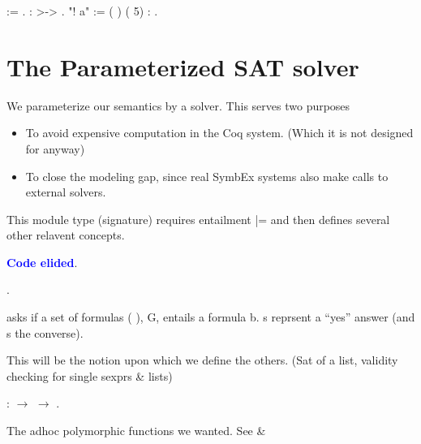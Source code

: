 \documentclass[12pt]{report}
\begin{document}
\begin{coqdoccode}
\coqdocnoindent
{}  :=  .\coqdoceol
\coqdocnoindent
{}  :  >-> .\coqdoceol
\coqdocnoindent
{} "! a" := (  ) (  5) : .\coqdoceol
\coqdocemptyline
\end{coqdoccode}
\section{The Parameterized SAT solver}

 We parameterize our semantics by a solver. This serves two purposes

\begin{itemize}
\item  To avoid expensive computation in the Coq system. (Which it is not designed for anyway) 

\item  To close the modeling gap, since real SymbEx systems also make calls to external solvers.

\end{itemize}


    This module type (signature) requires entailment |= and then defines several other relavent
    concepts.


    \textcolor{blue}{\textbf{Code elided}}.



\begin{coqdoccode}
\coqdocnoindent
{}  .\coqdoceol
\coqdocemptyline
\end{coqdoccode}
   asks if a set of formulas
      ( ), G, entails a formula b. s
      reprsent a ``yes'' answer (and s the converse).


      This will be the notion upon which we define the others.
      (Sat of a list, validity checking for single sexprs \& lists)


  
\begin{coqdoccode}
\coqdocindent{1.00em}
  :   \ensuremath{\rightarrow}  \ensuremath{\rightarrow}   .\coqdoceol
\coqdocemptyline
\end{coqdoccode}
The adhoc polymorphic functions we wanted. See  \& 
\end{document}
